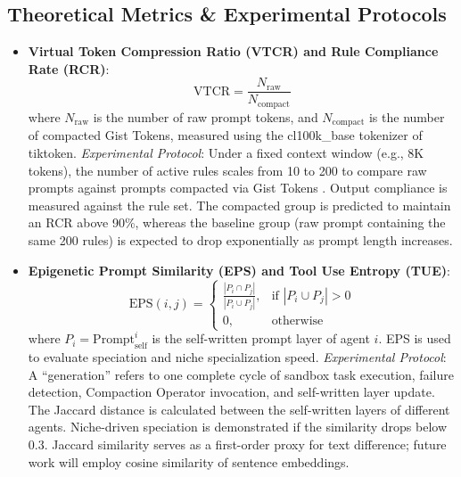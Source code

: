 \documentclass[10pt,journal,compsoc]{IEEEtran}
\begin{document}
\subsection{Theoretical Metrics \& Experimental Protocols}
\begin{itemize}
    \item \textbf{Virtual Token Compression Ratio (VTCR) and Rule Compliance Rate (RCR)}:
    \begin{equation}
    \text{VTCR} = \frac{N_{\text{raw}}}{N_{\text{compact}}}
    \end{equation}
    where $N_{\text{raw}}$ is the number of raw prompt tokens, and $N_{\text{compact}}$ is the number of compacted Gist Tokens, measured using the cl100k\_base tokenizer of tiktoken.
    \textit{Experimental Protocol}: Under a fixed context window (e.g., 8K tokens), the number of active rules scales from 10 to 200 to compare raw prompts against prompts compacted via Gist Tokens \cite{mu2023}. Output compliance is measured against the rule set. The compacted group is predicted to maintain an RCR above 90\%, whereas the baseline group (raw prompt containing the same 200 rules) is expected to drop exponentially as prompt length increases.
    
    \item \textbf{Epigenetic Prompt Similarity (EPS) and Tool Use Entropy (TUE)}:
    \begin{equation}
    \text{EPS}(i, j) = \begin{cases} 
    \frac{|P_i \cap P_j|}{|P_i \cup P_j|}, & \text{if } |P_i \cup P_j| > 0 \\ 
    0, & \text{otherwise} 
    \end{cases}
    \end{equation}
    where $P_i = \text{Prompt}_{\text{self}}^i$ is the self-written prompt layer of agent $i$. EPS is used to evaluate speciation and niche specialization speed.
    \textit{Experimental Protocol}: A ``generation'' refers to one complete cycle of sandbox task execution, failure detection, Compaction Operator invocation, and self-written layer update. The Jaccard distance is calculated between the self-written layers of different agents. Niche-driven speciation is demonstrated if the similarity drops below 0.3. Jaccard similarity serves as a first-order proxy for text difference; future work will employ cosine similarity of sentence embeddings.
    

\end{itemize}
\end{document}
